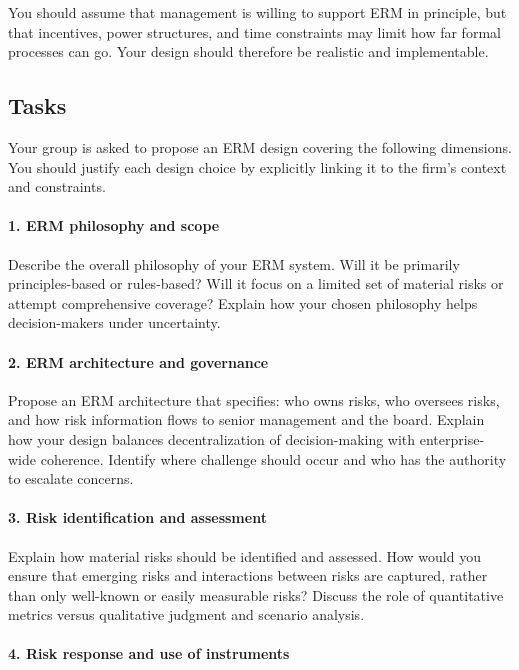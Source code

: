 \documentclass[11pt]{article}
\begin{document}
You should assume that management is willing to support ERM in principle, but
that incentives, power structures, and time constraints may limit how far
formal processes can go. Your design should therefore be realistic and
implementable.

\subsection*{Tasks}

Your group is asked to propose an ERM design covering the following dimensions.
You should justify each design choice by explicitly linking it to the firm’s
context and constraints.

\paragraph{1. ERM philosophy and scope}

Describe the overall philosophy of your ERM system. Will it be primarily
principles-based or rules-based? Will it focus on a limited set of material
risks or attempt comprehensive coverage? Explain how your chosen philosophy
helps decision-makers under uncertainty.

\paragraph{2. ERM architecture and governance}

Propose an ERM architecture that specifies:
who owns risks,
who oversees risks,
and how risk information flows to senior management and the board.
Explain how your design balances decentralization of decision-making with
enterprise-wide coherence. Identify where challenge should occur and who has
the authority to escalate concerns.

\paragraph{3. Risk identification and assessment}

Explain how material risks should be identified and assessed.
How would you ensure that emerging risks and interactions between risks are
captured, rather than only well-known or easily measurable risks?
Discuss the role of quantitative metrics versus qualitative judgment and
scenario analysis.

\paragraph{4. Risk response and use of instruments}
\end{document}
